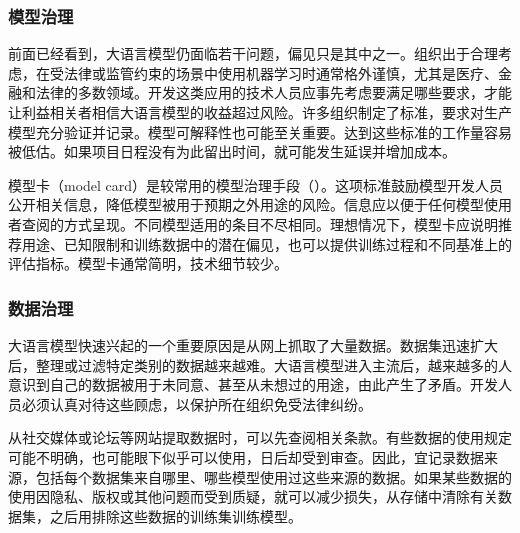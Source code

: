 \subsubsection{模型治理}
前面已经看到，大语言模型仍面临若干问题，偏见只是其中之一。组织出于合理考虑，在受法律或监管约束的场景中使用机器学习时通常格外谨慎，尤其是医疗、金融和法律的多数领域。开发这类应用的技术人员应事先考虑要满足哪些要求，才能让利益相关者相信大语言模型的收益超过风险。许多组织制定了标准，要求对生产模型充分验证并记录。模型可解释性也可能至关重要。达到这些标准的工作量容易被低估。如果项目日程没有为此留出时间，就可能发生延误并增加成本。

模型卡（model card）是较常用的模型治理手段（）。这项标准鼓励模型开发人员公开相关信息，降低模型被用于预期之外用途的风险。信息应以便于任何模型使用者查阅的方式呈现。不同模型适用的条目不尽相同。理想情况下，模型卡应说明推荐用途、已知限制和训练数据中的潜在偏见，也可以提供训练过程和不同基准上的评估指标。模型卡通常简明，技术细节较少。

\subsubsection{数据治理}
大语言模型快速兴起的一个重要原因是从网上抓取了大量数据。数据集迅速扩大后，整理或过滤特定类别的数据越来越难。大语言模型进入主流后，越来越多的人意识到自己的数据被用于未同意、甚至从未想过的用途，由此产生了矛盾。开发人员必须认真对待这些顾虑，以保护所在组织免受法律纠纷。

从社交媒体或论坛等网站提取数据时，可以先查阅相关条款。有些数据的使用规定可能不明确，也可能眼下似乎可以使用，日后却受到审查。因此，宜记录数据来源，包括每个数据集来自哪里、哪些模型使用过这些来源的数据。如果某些数据的使用因隐私、版权或其他问题而受到质疑，就可以减少损失，从存储中清除有关数据集，之后用排除这些数据的训练集训练模型。
